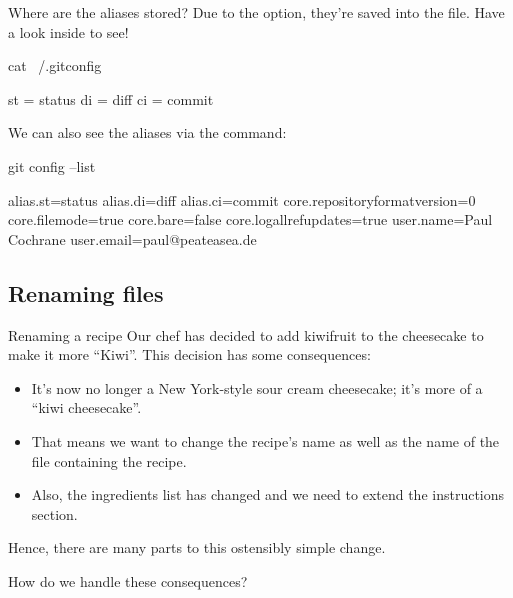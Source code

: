 \begin{frame}[fragile]{Where are the aliases stored?}
    Due to the  option, they're saved into the
     file.  Have a look inside to see!
    \begin{shellcode}
        cat ~/.gitconfig
    \end{shellcode}
    \begin{outputcode}
        [alias]
                st = status
                di = diff
                ci = commit
    \end{outputcode}

    We can also see the aliases via the  command:
    \begin{shellcode}
        git config --list
    \end{shellcode}
    \begin{outputcode}
        alias.st=status
        alias.di=diff
        alias.ci=commit
        core.repositoryformatversion=0
        core.filemode=true
        core.bare=false
        core.logallrefupdates=true
        user.name=Paul Cochrane
        user.email=paul@peateasea.de
    \end{outputcode}
\end{frame}

\subsection{Renaming files}

\begin{frame}[fragile]{Renaming a recipe}
    Our chef has decided to add kiwifruit to the cheesecake to make it more
    ``Kiwi''.  This decision has some consequences:
    \begin{itemize}
        \item It's now no longer a New York-style sour cream cheesecake;
            it's more of a ``kiwi cheesecake''.
        \item That means we want to change the recipe's name as well as the
            name of the file containing the recipe.
        \item Also, the ingredients list has changed and we need to extend
            the instructions section.
    \end{itemize}

    Hence, there are many parts to this ostensibly simple change.

    How do we handle these consequences?
\end{frame}

